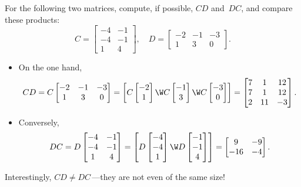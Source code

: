 \begin{example} 
For the following two matrices, compute, if possible, \(CD\) and~\(DC\), and compare these products:
\begin{equation*}
C=\begin{bmatrix} -4 & -1\\ -4 & -1\\ 1 & 4 \end{bmatrix},\quad
D=\begin{bmatrix} -2 & -1 & -3\\ 1 & 3 & 0 \end{bmatrix}.
\end{equation*}
\begin{solution} 
\begin{itemize}
\item On the one hand,
\begin{equation*}
CD=C\begin{bmatrix} -2 & -1 & -3\\ 1 & 3 & 0 \end{bmatrix}
=\begin{bmatrix} C\begin{bmatrix} -2\\1 \end{bmatrix}\W
C\begin{bmatrix} -1\\3 \end{bmatrix}\W
C\begin{bmatrix} -3\\0 \end{bmatrix}
 \end{bmatrix}
=\begin{bmatrix} 7&1&12\\7&1&12\\2&11&-3 \end{bmatrix}.
\end{equation*}

\item Conversely,
\begin{equation*}
DC=D\begin{bmatrix} -4 & -1\\ -4 & -1\\ 1 & 4 \end{bmatrix}
=\begin{bmatrix}  D\begin{bmatrix} -4\\-4\\1 \end{bmatrix}\W
D\begin{bmatrix} -1\\-1\\4 \end{bmatrix}
\end{bmatrix}
=\begin{bmatrix} 9&-9\\-16&-4 \end{bmatrix}.
\end{equation*}
\end{itemize}
Interestingly, \(CD\neq DC\)\,---they are not even of the same size!
\end{solution}
\end{example}


